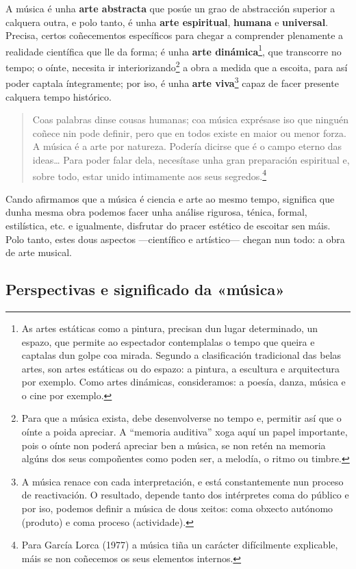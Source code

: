 \documentclass[a4paper, twoside]{templates/ociamthesis}
\begin{document}
A música é unha \textbf{arte abstracta} que posúe un grao de abstracción superior a calquera outra, e polo tanto, é unha \textbf{arte espiritual}, \textbf{humana} e \textbf{universal}. Precisa, certos coñecementos específicos para chegar a comprender plenamente a realidade científica que lle da forma; é unha \textbf{arte dinámica}\footnote{As artes estáticas como a pintura, precisan dun lugar determinado, un espazo, que permite ao espectador contemplalas o tempo que queira e captalas dun golpe coa mirada. Segundo a clasificación tradicional das belas artes, son artes estáticas ou do espazo: a pintura, a escultura e arquitectura por exemplo. Como artes dinámicas, consideramos: a poesía, danza, música e o cine por exemplo.}, que transcorre no tempo; o oínte, necesita ir interiorizando\footnote{Para que a música exista, debe desenvolverse no tempo e, permitir así que o oínte a poida apreciar. A ``memoria auditiva'' xoga aquí un papel importante, pois o oínte non poderá apreciar ben a música, se non retén na memoria algúns dos seus compoñentes como poden ser, a melodía, o ritmo ou timbre.} a obra a medida que a escoita, para así poder captala íntegramente; por iso, é unha \textbf{arte viva}\footnote{A música renace con cada interpretación, e está constantemente nun proceso de reactivación. O resultado, depende tanto dos intérpretes coma do público e por iso, podemos definir a música de dous xeitos: coma obxecto autónomo (produto) e coma proceso (actividade).} capaz de facer presente calquera tempo histórico.

\begin{quote}
Coas palabras dinse cousas humanas; coa música exprésase iso que ninguén coñece nin pode definir, pero que en todos existe en maior ou menor forza. A música é a arte por natureza. Podería dicirse que é o campo eterno das ideas\ldots{} Para poder falar dela, necesítase unha gran preparación espiritual e, sobre todo, estar unido intimamente aos seus segredos.\footnote{Para García Lorca (1977) a música tiña un carácter difícilmente explicable, máis se non coñecemos os seus elementos internos.}
\end{quote}

Cando afirmamos que a música é ciencia e arte ao mesmo tempo, significa que dunha mesma obra podemos facer unha análise rigurosa, ténica, formal, estilística, etc. e igualmente, disfrutar do pracer estético de escoitar sen máis. Polo tanto, estes dous aspectos ---científico e artístico--- chegan nun todo: a obra de arte musical.

\hypertarget{perspectivas-e-significado-da-muxfasica}{%
\subsection*{Perspectivas e significado da «música»}\label{perspectivas-e-significado-da-muxfasica}}
\end{document}
